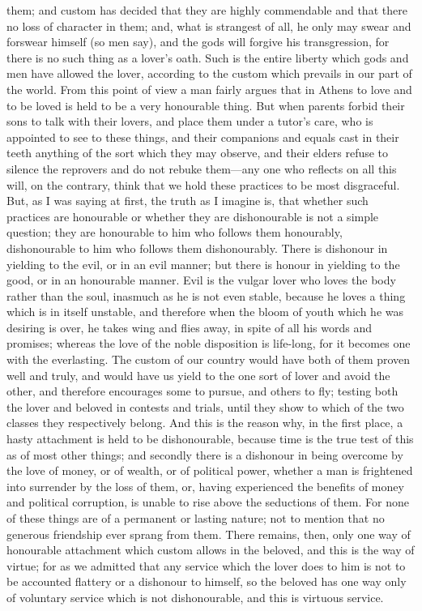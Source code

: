 \documentclass[11pt,letter]{article}
\begin{document}
them; and custom has decided that they are highly commendable and that there no loss of character in them; and, what is strangest of all, he only may swear and forswear himself (so men say), and the gods will forgive his transgression, for there is no such thing as a lover's oath. Such is the entire liberty which gods and men have allowed the lover, according to the custom which prevails in our part of the world. From this point of view a man fairly argues that in Athens to love and to be loved is held to be a very honourable thing. But when parents forbid their sons to talk with their lovers, and place them under a tutor's care, who is appointed to see to these things, and their companions and equals cast in their teeth anything of the sort which they may observe, and their elders refuse to silence the reprovers and do not rebuke them—any one who reflects on all this will, on the contrary, think that we hold these practices to be most disgraceful. But, as I was saying at first, the truth as I imagine is, that whether such practices are honourable or whether they are dishonourable is not a simple question; they are honourable to him who follows them honourably, dishonourable to him who follows them dishonourably. There is dishonour in yielding to the evil, or in an evil manner; but there is honour in yielding to the good, or in an honourable manner. Evil is the vulgar lover who loves the body rather than the soul, inasmuch as he is not even stable, because he loves a thing which is in itself unstable, and therefore when the bloom of youth which he was desiring is over, he takes wing and flies away, in spite of all his words and promises; whereas the love of the noble disposition is life-long, for it becomes one with the everlasting. The custom of our country would have both of them proven well and truly, and would have us yield to the one sort of lover and avoid the other, and therefore encourages some to pursue, and others to fly; testing both the lover and beloved in contests and trials, until they show to which of the two classes they respectively belong. And this is the reason why, in the first place, a hasty attachment is held to be dishonourable, because time is the true test of this as of most other things; and secondly there is a dishonour in being overcome by the love of money, or of wealth, or of political power, whether a man is frightened into surrender by the loss of them, or, having experienced the benefits of money and political corruption, is unable to rise above the seductions of them. For none of these things are of a permanent or lasting nature; not to mention that no generous friendship ever sprang from them. There remains, then, only one way of honourable attachment which custom allows in the beloved, and this is the way of virtue; for as we admitted that any service which the lover does to him is not to be accounted flattery or a dishonour to himself, so the beloved has one way only of voluntary service which is not dishonourable, and this is virtuous service.
\end{document}
